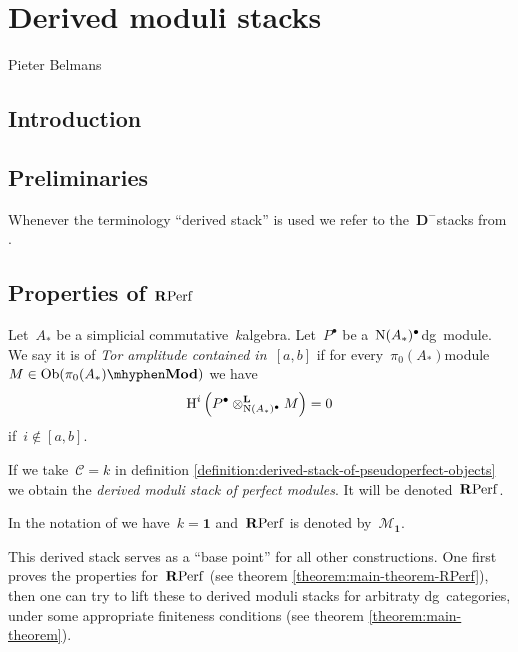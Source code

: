 \chapter{Derived moduli stacks}
\begin{flushright}
  Pieter Belmans
\end{flushright}

\begin{refsection}

\section{Introduction}

\section{Preliminaries}
Whenever the terminology ``derived stack'' is used we refer to the~$\mathbf{D}^-$\dash stacks from \cite{hagII}.

\section{Properties of \texorpdfstring{$\mathbf{R}\mathrm{Perf}$}{RPerf}}
\begin{definition}
  Let~$A_*$ be a simplicial commutative~$k$\dash algebra. Let~$P^\bullet$ be a~$\operatorname{N}(A_*)^\bullet$\dash dg~module. We say it is of \emph{Tor amplitude contained in~$[a,b]$} if for every~$\pi_0(A_*)$\dash module~$M\in\Ob(\pi_0(A_*)\mhyphen\Mod)$ we have
  \begin{equation}
    \operatorname{H}^i\left( P^\bullet\otimes_{\operatorname{N}(A_*)^\bullet}^{\mathbf{L}} M \right)=0
  \end{equation}
  if~$i\notin[a,b]$.
\end{definition}

\begin{definition}
  If we take~$\mathcal{C}=k$ in definition \ref{definition:derived-stack-of-pseudoperfect-objects} we obtain the \emph{derived moduli stack of perfect modules}. It will be denoted~$\mathbf{R}\mathrm{Perf}$.
\end{definition}

In the notation of \cite{toen-vaquie} we have~$k=\mathbf{1}$ and~$\mathbf{R}\mathrm{Perf}$ is denoted by~$\mathcal{M}_{\mathbf{1}}$.

This derived stack serves as a ``base point'' for all other constructions. One first proves the properties for~$\mathbf{R}\mathrm{Perf}$ (see theorem \ref{theorem:main-theorem-RPerf}), then one can try to lift these to derived moduli stacks for arbitraty dg~categories, under some appropriate finiteness conditions (see theorem \ref{theorem:main-theorem}).


\end{refsection}
